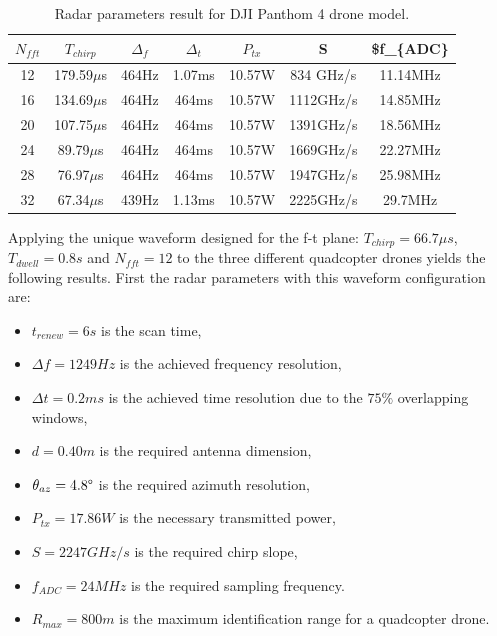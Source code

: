 \begin{table}[h!]
\centering
\begin{tabular}{|c|c|c|c|c|c|c|}
\hline
$N_{fft}$ & $T_{chirp}$ & $\Delta_f$ & $\Delta_t$ & $P_{tx}$ & S & \$f\_\{ADC\} \\ \hline
12 & 179.59$\mu$s & 464Hz & 1.07ms & 10.57W & 834 GHz/s & 11.14MHz \\ \hline
16 & 134.69$\mu$s & 464Hz & 464ms & 10.57W & 1112GHz/s & 14.85MHz \\ \hline
20 & 107.75$\mu$s & 464Hz & 464ms & 10.57W & 1391GHz/s & 18.56MHz \\ \hline
24 & 89.79$\mu$s & 464Hz & 464ms & 10.57W & 1669GHz/s & 22.27MHz \\ \hline
28 & 76.97$\mu$s & 464Hz & 464ms & 10.57W & 1947GHz/s & 25.98MHz \\ \hline
32 & 67.34$\mu$s & 439Hz & 1.13ms & 10.57W & 2225GHz/s & 29.7MHz \\ \hline
\end{tabular}
\caption{Radar parameters result for DJI Panthom 4 drone model.}
\label{tab:dji-panthom4-result}
\end{table}


Applying the unique waveform designed for the f-t plane: $T_{chirp} = 66.7 \mu s$, $T_{dwell} = 0.8s$ and $N_{fft} = 12 $ to the three different quadcopter drones yields the following results.
First the radar parameters with this waveform configuration are:

\begin{itemize}

    \item $t_{renew} = 6 s$ is the scan time,
    
    \item $\Delta f = 1249 Hz$ is the achieved frequency resolution,
    
    \item $\Delta t = 0.2 ms$ is the achieved time resolution due to the $75\%$ overlapping windows,
    
    \item $d = 0.40 m$ is the required antenna dimension,
         
    \item $\theta_{az} = 4.8\degree$ is the required azimuth resolution,

    \item $P_{tx} = 17.86 W$ is the necessary transmitted power,
    
    \item $S = 2247 GHz/s$ is the required chirp slope,
    
    \item $f_{ADC} = 24 MHz$ is the required sampling frequency.
    
    \item $R_{max} = 800 m$ is the maximum identification range for a quadcopter drone.

\end{itemize}


